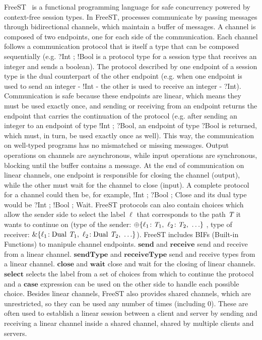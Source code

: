 \documentclass[sigplan]{acmart}
\newcommand{\Dual}{\text{Dual}}
\newcommand{\mbf}[1]{\mathbf{#1}}
\newcommand{\send}{\mbf{send}}
\newcommand{\receive}{\mbf{receive}}
\newcommand{\close}{\mbf{close}}
\newcommand{\wait}{\mbf{wait}}
\newcommand{\sendType}{\mbf{sendType}}
\newcommand{\receiveType}{\mbf{receiveType}}
\newcommand{\select}{\mbf{select}}
\newcommand{\case}{\mbf{case}}
\newcommand{\T}{\textit{\text{T}}}
\newcommand{\viewsend}{\oplus}
\newcommand{\viewreceive}{\text{\&}}
\newcommand{\lbl}{\ell}
\begin{document}
FreeST~\cite{freest} is a functional programming language for safe concurrency powered by context-free session types.
In FreeST, processes communicate by passing messages through bidirectional channels, which maintain a buffer of messages.
A channel is composed of two endpoints, one for each side of the communication.
Each channel follows a communication protocol that is itself a type that can be composed sequentially (e.g. ?Int ; !Bool is a protocol type for a session type that receives an integer and sends a boolean).
The protocol described by one endpoint of a session type is the dual counterpart of the other endpoint (e.g. when one endpoint is used to send an integer - !Int - the other is used to receive an integer - ?Int).
Communication is safe because these endpoints are linear, which means they must be used exactly once, and sending or receiving from an endpoint returns the endpoint that carries the continuation of the protocol (e.g. after sending an integer to an endpoint of type !Int ; ?Bool, an endpoint of type ?Bool is returned, which must, in turn, be used exactly once as well).
This way, the communication on well-typed programs has no mismatched or missing messages.
Output operations on channels are asynchronous, while input operations are synchronous, blocking until the buffer contains a message.
At the end of communication on linear channels, one endpoint is responsible for closing the channel (output), while the other must wait for the channel to close (input).
A complete protocol for a channel could then be, for example, !Int ; ?Bool ; Close and its dual type would be ?Int ; !Bool ; Wait.
FreeST protocols can also contain choices which allow the sender side to select the label $\lbl$ that corresponds to the path $\T$ it wants to continue on (type of the sender: $\viewsend\{\lbl_1\!: \T_1,~\lbl_2\!: \T_2,~\ldots\}$ , type of receiver: $\viewreceive\{\lbl_1\!: \Dual~\T_1,~\lbl_2\!: \Dual~\T_2,~\ldots\}$).
FreeST includes BIFs (Built-in Functions) to manipule channel endpoints.
$\send$ and $\receive$ send and receive from a linear channel.
$\sendType$ and $\receiveType$ send and receive types from a linear channel.
$\close$ and $\wait$ close and wait for the closing of linear channels.
$\select$ selects the label from a set of choices from which to continue the protocol and a $\case$ expression can be used on the other side to handle each possible choice.
Besides linear channels, FreeST also provides shared channels, which are unrestricted, so they can be used any number of times (including $0$).
These are often used to establish a linear session between a client and server by sending and receiving a linear channel inside a shared channel, shared by multiple clients and servers.
\end{document}
